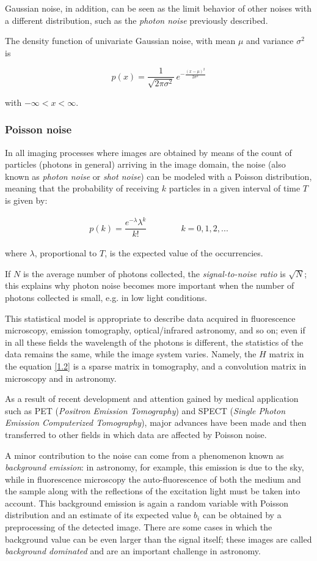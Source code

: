Gaussian noise, in addition, can be seen as the limit behavior of other noises with a different distribution, such as the \emph{photon noise} previously described.

The density function of univariate Gaussian noise, with mean $\mu$ and variance $\sigma^2$ is

$$p (x) = \frac{1}{\sqrt{2 \pi \sigma^2}}\, e^{-\frac{(x-\mu)^2}{2\sigma^2}}$$

with $-\infty < x < \infty$.

\subsubsection{Poisson noise}

In all imaging processes where images are obtained by means of the count of particles (photons in general) arriving in the image domain, the noise (also known as \emph{photon noise} or \emph{shot noise}) can be modeled with a Poisson distribution, meaning that the probability of receiving $k$ particles in a given interval of time $T$ is given by:

\begin{align}
p(k) = \dfrac{ e^{-\lambda} \lambda^k }{k!} \qquad \qquad k = 0,1,2, ...
\end{align}

where $\lambda$, proportional to $T$, is the expected value of the occurrencies.

If $N$ is the average number of photons collected, the \emph{signal-to-noise ratio} is $\sqrt{N}$; this explains why photon noise becomes more important when the number of photons collected is small, e.g. in low light conditions.

This statistical model is appropriate to describe data acquired in fluorescence microscopy, emission tomography, optical/infrared astronomy, and so on; even if in all these fields the wavelength of the photons is different, the statistics of the data remains the same, while the image system varies. Namely, the $H$ matrix in the equation \eqref{1.2} is a sparse matrix in tomography, and a convolution matrix in microscopy and in astronomy.

As a result of recent development and attention gained by medical application such as PET (\emph{Positron Emission Tomography}) and SPECT (\emph{Single Photon Emission Computerized Tomography}), major advances have been made and then transferred to other fields in which data are affected by Poisson noise.

A minor contribution to the noise can come from a phenomenon known as \emph{background emission}: in astronomy, for example, this emission is due to the sky, while in fluorescence microscopy the auto-fluorescence of both the medium and the sample along with the reflections of the excitation light must be taken into account. This background emission is again a random variable with Poisson distribution and an estimate of its expected value $b_i$ can be obtained by a preprocessing of the detected image. There are some cases in which the background value can be even larger than the signal itself; these images are called \emph{background dominated} and are an important challenge in astronomy.


